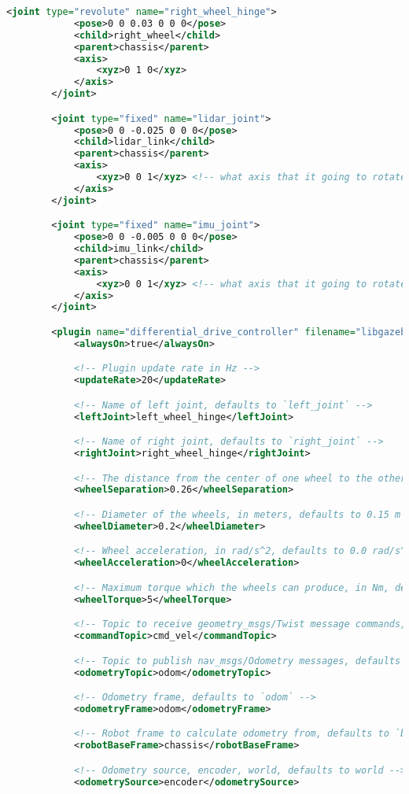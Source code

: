 \begin{appendices}
\begin{lstlisting}[language=XML]
		<joint type="revolute" name="right_wheel_hinge">
			<pose>0 0 0.03 0 0 0</pose>
			<child>right_wheel</child>
			<parent>chassis</parent>
			<axis>
				<xyz>0 1 0</xyz>
			</axis>
		</joint>

		<joint type="fixed" name="lidar_joint">
			<pose>0 0 -0.025 0 0 0</pose>
			<child>lidar_link</child>
			<parent>chassis</parent>
			<axis>
				<xyz>0 0 1</xyz> <!-- what axis that it going to rotate about-->
			</axis>
		</joint>

		<joint type="fixed" name="imu_joint">
			<pose>0 0 -0.005 0 0 0</pose>
			<child>imu_link</child>
			<parent>chassis</parent>
			<axis>
				<xyz>0 0 1</xyz> <!-- what axis that it going to rotate about-->
			</axis>
		</joint>

		<plugin name="differential_drive_controller" filename="libgazebo_ros_diff_drive.so">
			<alwaysOn>true</alwaysOn>

			<!-- Plugin update rate in Hz -->
			<updateRate>20</updateRate>

			<!-- Name of left joint, defaults to `left_joint` -->
			<leftJoint>left_wheel_hinge</leftJoint>

			<!-- Name of right joint, defaults to `right_joint` -->
			<rightJoint>right_wheel_hinge</rightJoint>

			<!-- The distance from the center of one wheel to the other, in meters, defaults to 0.34 m -->
			<wheelSeparation>0.26</wheelSeparation>

			<!-- Diameter of the wheels, in meters, defaults to 0.15 m -->
			<wheelDiameter>0.2</wheelDiameter>

			<!-- Wheel acceleration, in rad/s^2, defaults to 0.0 rad/s^2 -->
			<wheelAcceleration>0</wheelAcceleration>

			<!-- Maximum torque which the wheels can produce, in Nm, defaults to 5 Nm -->
			<wheelTorque>5</wheelTorque>

			<!-- Topic to receive geometry_msgs/Twist message commands, defaults to `cmd_vel` -->
			<commandTopic>cmd_vel</commandTopic>

			<!-- Topic to publish nav_msgs/Odometry messages, defaults to `odom` -->
			<odometryTopic>odom</odometryTopic>

			<!-- Odometry frame, defaults to `odom` -->
			<odometryFrame>odom</odometryFrame>

			<!-- Robot frame to calculate odometry from, defaults to `base_footprint` -->
			<robotBaseFrame>chassis</robotBaseFrame>

			<!-- Odometry source, encoder, world, defaults to world -->
			<odometrySource>encoder</odometrySource>


\end{lstlisting}
\end{appendices}
